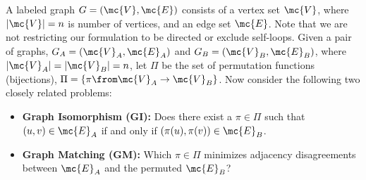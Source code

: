\documentclass[10pt,journal,cspaper,compsoc]{IEEEtran}
\begin{document}
A labeled graph $G=(\mc{V},\mc{E})$ consists of a vertex set $\mc{V}$, where $|\mc{V}|=n$ is number of vertices, and an edge set $\mc{E}$. %
Note that we are not restricting our formulation to be directed or exclude self-loops. Given a pair of graphs, $G_A=(\mc{V}_A,\mc{E}_A)$ and $G_B=(\mc{V}_B,\mc{E}_B)$, where $|\mc{V}_A|=|\mc{V}_B|=n$, 
let $\Pi$ be the set of permutation functions (bijections), $\Pi=\{\pi \from \mc{V}_A \to \mc{V}_B\}$.
Now consider the following two closely related problems:
\begin{itemize}
	\item \textbf{Graph Isomorphism (GI):}  Does there exist a $\pi \in \Pi$ such that $(u,v) \in \mc{E}_A$ if and only if $(\pi(u),\pi(v)) \in \mc{E}_B$. 
		\item \textbf{Graph Matching (GM):}
		 Which $\pi \in \Pi$ minimizes adjacency disagreements between $\mc{E}_A$ and the permuted $\mc{E}_B$?
\end{itemize}
\end{document}
